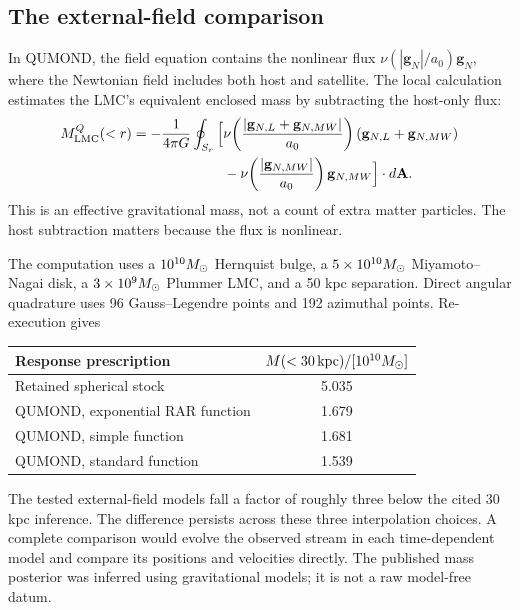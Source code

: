 \subsection{The external-field comparison}

In QUMOND, the field equation contains the nonlinear flux
$\nu(|\mathbf g_N|/a_0)\mathbf g_N$, where the Newtonian field includes
both host and satellite. The local calculation estimates the LMC's
equivalent enclosed mass by subtracting the host-only flux:
\begin{align}
M_{\rm LMC}^{Q}(<r)=-\frac1{4\pi G}\oint_{S_r}
\Big[&\nu\!\left(\frac{|\mathbf g_{N,L}+\mathbf g_{N,MW}|}{a_0}\right)
(\mathbf g_{N,L}+\mathbf g_{N,MW})\nonumber\\
&-\nu\!\left(\frac{|\mathbf g_{N,MW}|}{a_0}\right)
\mathbf g_{N,MW}\Big]\cdot d\mathbf A.
\label{eq:flux}
\end{align}
This is an effective gravitational mass, not a count of extra matter
particles. The host subtraction matters because the flux is nonlinear.

The computation uses a $10^{10}M_\odot$ Hernquist bulge, a
$5\times10^{10}M_\odot$ Miyamoto--Nagai disk, a $3\times10^9M_\odot$
Plummer LMC, and a 50 kpc separation. Direct angular quadrature uses
96 Gauss--Legendre points and 192 azimuthal points. Re-execution gives
\begin{center}
\begin{tabular}{lc}
\toprule
Response prescription & $M(<30\,\mathrm{kpc})/[10^{10}M_\odot]$\\
\midrule
Retained spherical stock & 5.035\\
QUMOND, exponential RAR function & 1.679\\
QUMOND, simple function & 1.681\\
QUMOND, standard function & 1.539\\
\bottomrule
\end{tabular}
\end{center}
The tested external-field models fall a factor of roughly three below the
cited 30 kpc inference. The difference persists across these three
interpolation choices. A complete comparison would evolve the observed
stream in each time-dependent model and compare its positions and
velocities directly. The published mass posterior was inferred using
gravitational models; it is not a raw model-free datum.

